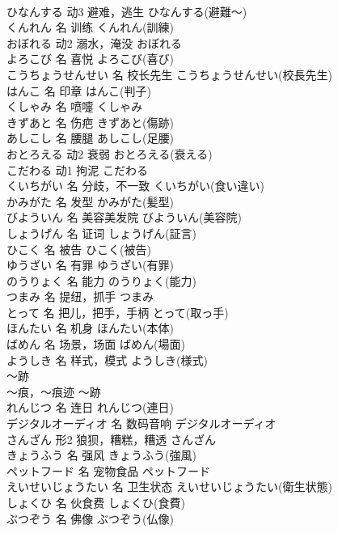 \documentclass[8pt]{extreport}
\begin{document}
\begin{CJK}{UTF8}{min}
\\	ひなんする	动3	避难，逃生	ひなんする(避難～)	
\\	くんれん	名	训练	くんれん(訓練)	
\\	おぼれる	动2	溺水，淹没	おぼれる	
\\	よろこび	名	喜悦	よろこび(喜び)	
\\	こうちょうせんせい	名	校长先生	こうちょうせんせい(校長先生)	
\\	はんこ	名	印章	はんこ(判子)	
\\	くしゃみ	名	喷嚏	くしゃみ	
\\	きずあと	名	伤疤	きずあと(傷跡)	
\\	あしこし	名	腰腿	あしこし(足腰)	
\\	おとろえる	动2	衰弱	おとろえる(衰える)	
\\	こだわる	动1	拘泥	こだわる	
\\	くいちがい	名	分歧，不一致	くいちがい(食い違い)	
\\	かみがた	名	发型	かみがた(髪型)	
\\	びよういん	名	美容美发院	びよういん(美容院)	
\\	しょうげん	名	证词	しょうげん(証言)	
\\	ひこく	名	被告	ひこく(被告)	
\\	ゆうざい	名	有罪	ゆうざい(有罪)	
\\	のうりょく	名	能力	のうりょく(能力)	
\\	つまみ	名	提纽，抓手	つまみ	
\\	とって	名	把儿，把手，手柄	とって(取っ手)	
\\	ほんたい	名	机身	ほんたい(本体)	
\\	ばめん	名	场景，场面	ばめん(場面)	
\\	ようしき	名	样式，模式	ようしき(様式)	
\\	～跡	
\\	～痕，～痕迹	～跡	
\\	れんじつ	名	连日	れんじつ(連日)	
\\	デジタルオーディオ	名	数码音响	デジタルオーディオ	
\\	さんざん	形2	狼狈，糟糕，糟透	さんざん	
\\	きょうふう	名	强风	きょうふう(強風)	
\\	ペットフード	名	宠物食品	ペットフード	
\\	えいせいじょうたい	名	卫生状态	えいせいじょうたい(衛生状態)	
\\	しょくひ	名	伙食费	しょくひ(食費)	
\\	ぶつぞう	名	佛像	ぶつぞう(仏像)	

\end{CJK}
\end{document}
